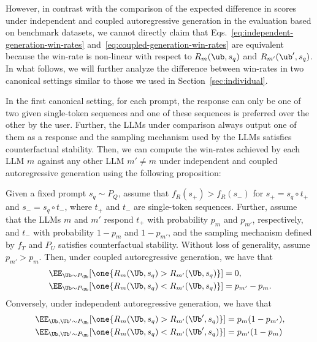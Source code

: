 However, in contrast with the comparison of the expected difference in scores under independent and coupled autoregressive generation in the evaluation based on benchmark datasets, 
%
we cannot directly claim that Eqs.~\ref{eq:independent-generation-win-rates} and~\ref{eq:coupled-generation-win-rates} are equivalent because the win-rate is non-linear with respect to $R_{m}(\ub, s_q)$ and $R_{m'}(\ub', s_q)$. 
%
In what follows, we will further analyze the difference between win-rates in two canonical settings similar to those we used in Section~\ref{sec:individual}.

In the first canonical setting, for each prompt, the response can only be one of two given single-token sequences and one of these sequences is preferred over the other by the user.
Further, the LLMs under comparison always output one of them as a response and the sampling mechanism used by the LLMs satisfies counterfactual stability. 
%
Then, we can compute the win-rates achieved by each LLM $m$ against any other LLM $m' \neq m$ under independent and coupled autoregressive generation using the following proposition:
\begin{proposition}\label{prop:gap_win_rates_stability}
    Given a fixed prompt $s_q \sim P_{Q}$, assume that $f_{R}(s_+)>f_{R}(s_-)$ for $s_+ = s_q \circ t_+$ and $s_-=s_q \circ t_-$, where $t_+$ and $t_-$ are single-token sequences. 
    Further, assume that the LLMs $m$ and $m'$ respond $t_+$ with probability $p_{m}$ and $p_{m'}$, respectively, and $t_-$ with probability $1-p_{m}$ and $1-p_{m'}$, and the sampling mechanism defined by $f_T$ and $P_{U}$ satisfies counterfactual stability. Without loss of generality, assume $p_{m'} > p_{m}$. 
    Then, under
    coupled
    autoregressive generation, we have that
    \begin{equation}     \label{eq:gap_win_rates_stability_coupled}
    \begin{split}
        \EE_{\Ub\sim P_{\Ub}}[\one\{R_m(\Ub, s_q)>R_{m'}(\Ub, s_q)\}] &= 0,  \\ 
        \EE_{\Ub\sim P_{\Ub}}[\one\{R_m(\Ub, s_q)<R_{m'}(\Ub, s_q)\}] &= p_{m'} - p_{m}.
    \end{split}
    \end{equation}
    Conversely, under
    independent
    autoregressive generation, we have that
    \begin{equation}    \label{eq:gap_win_rates_stability_independent}
    \begin{split}
        \EE_{\Ub, \Ub' \sim P_{\Ub}}[\one\{R_m(\Ub, s_q)>R_{m'}(\Ub', s_q)\}] &= p_m (1-p_{m'}), \\
        \EE_{\Ub, \Ub' \sim P_{\Ub}}[\one\{R_m(\Ub, s_q)<R_{m'}(\Ub', s_q)\}] &= p_{m'} (1-p_{m}) 
    \end{split}
    \end{equation}
\end{proposition}
